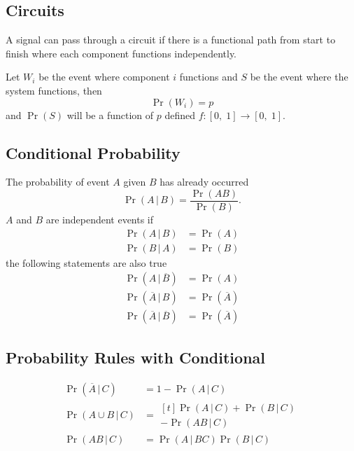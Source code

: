 \documentclass{article}
\begin{document}
\begin{multicols}{3}
    \subsection{Circuits}
    A signal can pass through a circuit if there is a functional path from start to finish where
    each component functions independently.

    Let \(W_i\) be the event where component \(i\) functions
    and \(S\) be the event where the system functions, then
    \begin{equation*}
        \Pr{\left( W_i \right)} = p
    \end{equation*}
    and \(\Pr{\left( S \right)}\) will be a function of \(p\) defined \(f:\left[ 0,\; 1 \right] \to \left[ 0,\; 1 \right]\).
    \subsection{Conditional Probability}
    The probability of event \(A\) given \(B\) has already occurred
    \begin{equation*}
        \Pr{\left( A \,\vert\, B \right)} = \frac{\Pr{\left( A B \right)}}{\Pr{\left( B \right)}}.
    \end{equation*}
    \(A\) and \(B\) are independent events if
    \begin{align*}
        \Pr{\left( A \,\vert\, B \right)} & = \Pr{\left( A \right)} \\
        \Pr{\left( B \,\vert\, A \right)} & = \Pr{\left( B \right)}
    \end{align*}
    the following statements are also true
    \begin{align*}
        \Pr{\left( A \,\vert\, \overline{B} \right)}            & = \Pr{\left( A \right)}            \\
        \Pr{\left( \overline{A} \,\vert\, B \right)}            & = \Pr{\left( \overline{A} \right)} \\
        \Pr{\left( \overline{A} \,\vert\, \overline{B} \right)} & = \Pr{\left( \overline{A} \right)}
    \end{align*}
    \subsection{Probability Rules with Conditional}
    \begin{align*}
        \Pr{\left( \overline{A} \,\vert\, C \right)} & = 1 - \Pr{\left( A \,\vert\, C \right)}                                 \\
        \Pr{\left( A \cup B \,\vert\, C \right)}     & = \begin{aligned}[t]
                                                             \Pr{\left( A \,\vert\, C \right)} + \Pr{\left( B \,\vert\, C \right)} \\
                                                             - \Pr{\left( AB \,\vert\, C \right)}
                                                         \end{aligned} \\
        \Pr{\left( A B \,\vert\, C \right)}          & = \Pr{\left( A \,\vert\, BC \right)} \Pr{\left( B \,\vert\, C \right)}
    \end{align*}

\end{multicols}
\end{document}
